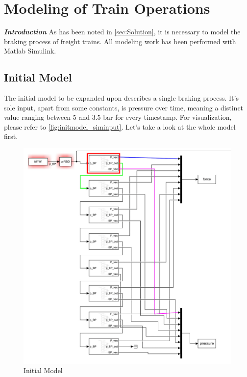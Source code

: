\chapter{Modeling of Train Operations}
\label{chap:ModelingOfTrainOperations}
\par\noindent
\emph{\textbf{Introduction}} As has been noted in \ref{sec:Solution}, it is necessary to model the braking process of freight trains. All modeling work has been performed with Matlab Simulink. 

\section{Initial Model}
\label{sec:InitialModel}
\par\noindent
The initial model to be expanded upon describes a single braking process. It's sole input, apart from some constants, is pressure over time, meaning a distinct value ranging between 5 and 3.5 bar for every timestamp. For visualization, please refer to \ref{fig:initmodel_siminput}. Let's take a look at the whole model first. 

\begin{figure}[H]
	\centering
	\includegraphics[width=\linewidth]{./pic/initmodel_whole}
	\caption{Initial Model}
	\label{fig:initmodel_whole}
\end{figure}

